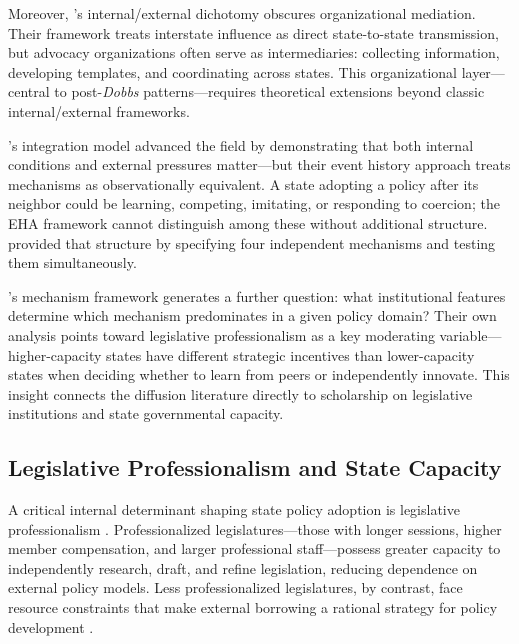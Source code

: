 Moreover, \textcite{berryStateLotteryAdoptions1990}'s internal/external dichotomy obscures organizational mediation. Their framework treats interstate influence as direct state-to-state transmission, but advocacy organizations often serve as intermediaries: collecting information, developing templates, and coordinating across states. This organizational layer---central to post-\emph{Dobbs} patterns---requires theoretical extensions beyond classic internal/external frameworks.

\textcite{berryStateLotteryAdoptions1990}'s integration model advanced the field by demonstrating that both internal conditions and external pressures matter---but their event history approach treats mechanisms as observationally equivalent. A state adopting a policy after its neighbor could be learning, competing, imitating, or responding to coercion; the EHA framework cannot distinguish among these without additional structure. \textcite{shipanMechanismsPolicyDiffusion2008a} provided that structure by specifying four independent mechanisms and testing them simultaneously.

\textcite{shipanMechanismsPolicyDiffusion2008a}'s mechanism framework generates a further question: what institutional features determine which mechanism predominates in a given policy domain? Their own analysis points toward legislative professionalism as a key moderating variable---higher-capacity states have different strategic incentives than lower-capacity states when deciding whether to learn from peers or independently innovate. This insight connects the diffusion literature directly to scholarship on legislative institutions and state governmental capacity.

\subsection{Legislative Professionalism and State Capacity}
A critical internal determinant shaping state policy adoption is legislative professionalism \parencite{squireLegislativeProfessionalizationMembership1992a,squireMeasuringStateLegislative2007,mooneyLegislativeMoralityAmerican1995}. Professionalized legislatures---those with longer sessions, higher member compensation, and larger professional staff---possess greater capacity to independently research, draft, and refine legislation, reducing dependence on external policy models. Less professionalized legislatures, by contrast, face resource constraints that make external borrowing a rational strategy for policy development \parencite{jansaCopyPasteLawmaking2019}.

